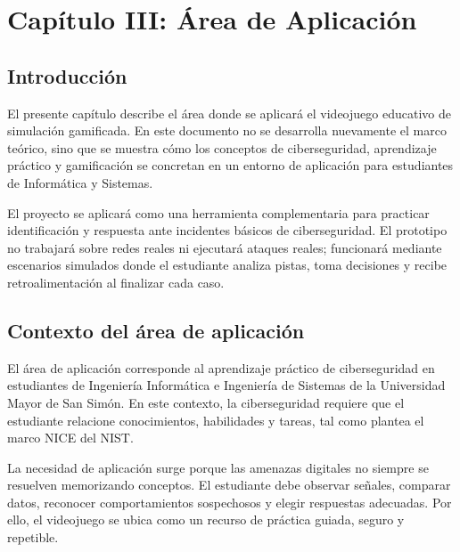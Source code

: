 \section[Cap\'{i}tulo III: \'{A}rea de Aplicaci\'{o}n]{\centering Cap\'{i}tulo III: \'{A}rea de Aplicaci\'{o}n}

\subsection{Introducci\'{o}n}

El presente cap\'{i}tulo describe el \'{a}rea donde se aplicar\'{a} el videojuego educativo de simulaci\'{o}n gamificada. En este documento no se desarrolla nuevamente el marco te\'{o}rico, sino que se muestra c\'{o}mo los conceptos de ciberseguridad, aprendizaje pr\'{a}ctico y gamificaci\'{o}n se concretan en un entorno de aplicaci\'{o}n para estudiantes de Inform\'{a}tica y Sistemas.

El proyecto se aplicar\'{a} como una herramienta complementaria para practicar identificaci\'{o}n y respuesta ante incidentes b\'{a}sicos de ciberseguridad. El prototipo no trabajar\'{a} sobre redes reales ni ejecutar\'{a} ataques reales; funcionar\'{a} mediante escenarios simulados donde el estudiante analiza pistas, toma decisiones y recibe retroalimentaci\'{o}n al finalizar cada caso.

\subsection{Contexto del \'{a}rea de aplicaci\'{o}n}

El \'{a}rea de aplicaci\'{o}n corresponde al aprendizaje pr\'{a}ctico de ciberseguridad en estudiantes de Ingenier\'{i}a Inform\'{a}tica e Ingenier\'{i}a de Sistemas de la Universidad Mayor de San Sim\'{o}n. En este contexto, la ciberseguridad requiere que el estudiante relacione conocimientos, habilidades y tareas, tal como plantea el marco NICE del NIST.

La necesidad de aplicaci\'{o}n surge porque las amenazas digitales no siempre se resuelven memorizando conceptos. El estudiante debe observar se\~{n}ales, comparar datos, reconocer comportamientos sospechosos y elegir respuestas adecuadas. Por ello, el videojuego se ubica como un recurso de pr\'{a}ctica guiada, seguro y repetible.

